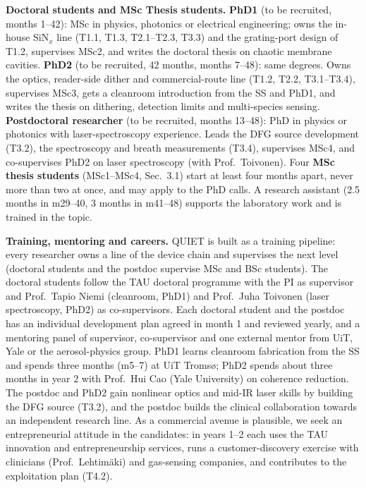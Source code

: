 \documentclass[a4paper,12pt]{article}
\newcommand{\jc}[1]{\textcolor{dkrust}{#1}} %
\newcommand{\nc}[1]{\textcolor{dkleaf}{#1}} %
\begin{document}
\textbf{Doctoral students and MSc Thesis students.} \textbf{PhD1} (to be recruited, months 1--42): MSc in physics, photonics or electrical engineering; owns the in-house SiN$_x$ line (T1.1, T1.3, T2.1--T2.3, T3.3) \nc{and the grating-port design of T1.2}, supervises MSc2, and writes the doctoral thesis on chaotic membrane cavities. \textbf{PhD2} (to be recruited, \nc{42} months, months \nc{7}--48): same degrees. Owns the optics, \nc{reader-side }dither and commercial-route line (T1.2, T2.2, T3.1--T3.4), supervises MSc3, gets a cleanroom introduction from the SS and PhD1, and writes the thesis on dithering, detection limits and multi-species sensing. \textbf{Postdoctoral researcher} (to be recruited, months 13--48): PhD in physics or photonics with laser-spectroscopy experience. Leads the DFG source development (T3.2), the spectroscopy and breath measurements (T3.4), supervises MSc4, and co-supervises PhD2 on laser spectroscopy (with Prof.\ Toivonen). \nc{Four} \textbf{MSc thesis students} (MSc1--MSc\nc{4}, Sec.~3.1) start at least four months apart, never more than two at once, and may apply to the PhD calls. A research assistant (2.5 months in m29--40, 3 months in m41--48) supports the laboratory work and is trained in the topic.

\textbf{Training, mentoring and careers.} QUIET is built as a training pipeline: every researcher owns a line of the device chain and supervises the next level (doctoral students and the postdoc supervise MSc and BSc students). The doctoral students follow the TAU doctoral programme with the PI as supervisor and Prof.\ Tapio Niemi (cleanroom, PhD1) and Prof.\ Juha Toivonen (laser spectroscopy, PhD2) as co-supervisors. Each doctoral student and the postdoc has an individual development plan agreed in month 1 and reviewed yearly, and a mentoring panel of supervisor, co-supervisor and one external mentor from UiT, Yale or the aerosol-physics group. PhD1 learns cleanroom fabrication from the SS and spends three months (m5--7) at UiT Tromsø; PhD2 spends about three months in year 2 with Prof.\ Hui Cao (Yale University) on coherence reduction. The postdoc and PhD2 gain nonlinear optics and mid-IR laser skills by building the DFG source (T3.2), and the postdoc builds the clinical collaboration towards an independent research line. As a commercial avenue is plausible, we seek an entrepreneurial attitude in the candidates: in years 1--2 each uses the TAU innovation and entrepreneurship services, runs a customer-discovery exercise with clinicians \jc{(Prof.~Lehtim\"aki)} and gas-sensing companies, and contributes to the exploitation plan (T4.2).
\end{document}
